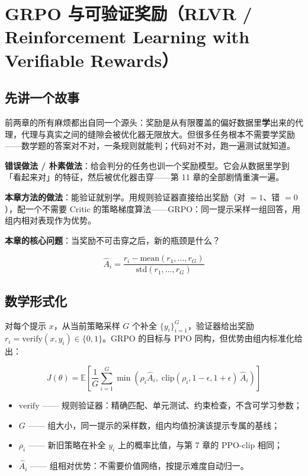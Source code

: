 \documentclass{article}
\begin{document}
\section*{GRPO 与可验证奖励（RLVR / Reinforcement Learning with Verifiable Rewards）}

\subsection*{先讲一个故事}

前两章的所有麻烦都出自同一个源头：奖励是从有限覆盖的偏好数据里\textbf{学}出来的代理，代理与真实之间的缝隙会被优化器无限放大。但很多任务根本不需要学奖励——数学题的答案对不对，一条规则就能判；代码对不对，跑一遍测试就知道。

\textbf{错误做法 / 朴素做法}：给会判分的任务也训一个奖励模型。它会从数据里学到「看起来对」的特征，然后被优化器击穿——第 11 章的全部剧情重演一遍。

\textbf{本章方法的做法}：能验证就别学。用规则验证器直接给出奖励（对 $=1$、错 $=0$），配一个不需要 Critic 的策略梯度算法——GRPO：同一提示采样一组回答，用组内相对表现作为优势。

\textbf{本章的核心问题}：当奖励不可击穿之后，新的瓶颈是什么？

\[
\boxed{\hat{A}_{i} = \frac{r_{i} - \mathrm{mean}(r_{1},\dots,r_{G})}{\mathrm{std}(r_{1},\dots,r_{G})}}
\]

\subsection*{数学形式化}

对每个提示 $x$，从当前策略采样 $G$ 个补全 $\{y_{i}\}_{i=1}^{G}$，验证器给出奖励 $r_{i}=\mathrm{verify}(x, y_{i})\in\{0,1\}$。GRPO 的目标与 PPO 同构，但优势由组内标准化给出：

\[
\boxed{J(\theta) = \mathbb{E}\left[\frac{1}{G}\sum_{i=1}^{G} \min\!\left(\rho_{i}\hat{A}_{i},\; \mathrm{clip}(\rho_{i}, 1\!-\!\epsilon, 1\!+\!\epsilon)\,\hat{A}_{i}\right)\right]}
\]

\begin{itemize}
  \item $\mathrm{verify}$ —— 规则验证器：精确匹配、单元测试、约束检查，不含可学习参数；
  \item $G$ —— 组大小，同一提示的采样数，组内均值扮演该提示专属的基线；
  \item $\rho_{i}$ —— 新旧策略在补全 $y_{i}$ 上的概率比值，与第 7 章的 PPO-clip 相同；
  \item $\hat{A}_{i}$ —— 组相对优势：不需要价值网络，按提示难度自动归一。
\end{itemize}
\end{document}
